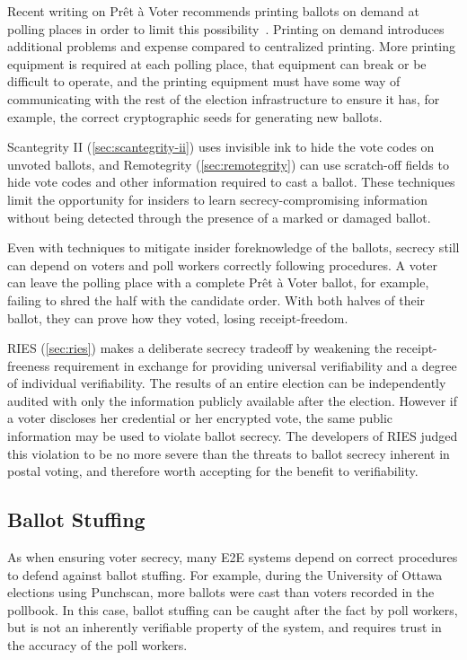 Recent writing on Prêt à Voter recommends printing ballots on demand
at polling places in order to limit this
possibility~\cite{ryan2009}. Printing on demand introduces additional
problems and expense compared to centralized printing. More printing
equipment is required at each polling place, that equipment can break
or be difficult to operate, and the printing equipment must have some
way of communicating with the rest of the election infrastructure to
ensure it has, for example, the correct cryptographic seeds for
generating new ballots.

Scantegrity II (\autoref{sec:scantegrity-ii}) uses invisible ink to hide
the vote codes on unvoted ballots, and Remotegrity
(\autoref{sec:remotegrity}) can use scratch-off fields to hide vote codes
and other information required to cast a ballot. These techniques
limit the opportunity for insiders to learn secrecy-compromising
information without being detected through the presence of a marked or
damaged ballot.

Even with techniques to mitigate insider foreknowledge of the ballots,
secrecy still can depend on voters and poll workers correctly
following procedures. A voter can leave the polling place with a
complete Prêt à Voter ballot, for example, failing to shred the half
with the candidate order. With both halves of their ballot, they can
prove how they voted, losing receipt-freedom.

RIES (\autoref{sec:ries}) makes a deliberate secrecy tradeoff by
weakening the receipt-freeness requirement in exchange for providing
universal verifiability and a degree of individual verifiability. The
results of an entire election can be independently audited with only
the information publicly available after the election. However if a
voter discloses her credential or her encrypted vote, the same public
information may be used to violate ballot secrecy. The developers of
RIES judged this violation to be no more severe than the threats to
ballot secrecy inherent in postal voting, and therefore worth
accepting for the benefit to verifiability.

\subsection{Ballot Stuffing}

As when ensuring voter secrecy, many E2E systems depend on correct
procedures to defend against ballot stuffing. For example, during the
University of Ottawa elections using Punchscan, more ballots were cast
than voters recorded in the pollbook. In this case, ballot stuffing
can be caught after the fact by poll workers, but is not an inherently
verifiable property of the system, and requires trust in the accuracy
of the poll workers.


